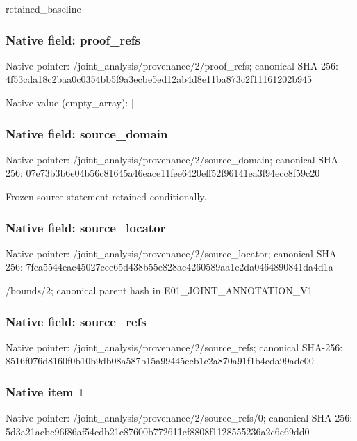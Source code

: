 \documentclass[10pt,a4paper]{article}
\begin{document}
\begingroup\raggedright\sloppy retained\_\allowbreak{}baseline\par\endgroup

\subsubsection{Native field: proof\_\allowbreak{}refs}
Native pointer: /joint\_\allowbreak{}analysis/provenance/2/proof\_\allowbreak{}refs; canonical SHA-256: 4f53cda18c2baa0c0354bb5f9a3ecbe5ed12ab4d8e11ba873c2f11161202b945

Native value (empty\_\allowbreak{}array): []

\subsubsection{Native field: source\_\allowbreak{}domain}
Native pointer: /joint\_\allowbreak{}analysis/provenance/2/source\_\allowbreak{}domain; canonical SHA-256: 07e73b3b6e04b56c81645a46eace11fee6420eff52f96141ea3f94ecc8f59c20

\begingroup\raggedright\sloppy Frozen source statement retained conditionally.\par\endgroup

\subsubsection{Native field: source\_\allowbreak{}locator}
Native pointer: /joint\_\allowbreak{}analysis/provenance/2/source\_\allowbreak{}locator; canonical SHA-256: 7fca5544eac45027cee65d438b55e828ac4260589aa1c2da0464890841da4d1a

\begingroup\raggedright\sloppy /\allowbreak{}bounds/\allowbreak{}2;\allowbreak{} canonical parent hash in E01\_\allowbreak{}JOINT\_\allowbreak{}ANNOTATION\_\allowbreak{}V1\par\endgroup

\subsubsection{Native field: source\_\allowbreak{}refs}
Native pointer: /joint\_\allowbreak{}analysis/provenance/2/source\_\allowbreak{}refs; canonical SHA-256: 8516f076d8160f0b10b9db08a587b15a99445ecb1c2a870a91f1b4cda99adc00

\subsubsection{Native item 1}
Native pointer: /joint\_\allowbreak{}analysis/provenance/2/source\_\allowbreak{}refs/0; canonical SHA-256: 5d3a21acbc96f86af54cdb21c87600b772611ef8808f1128555236a2c6c69dd0
\end{document}

